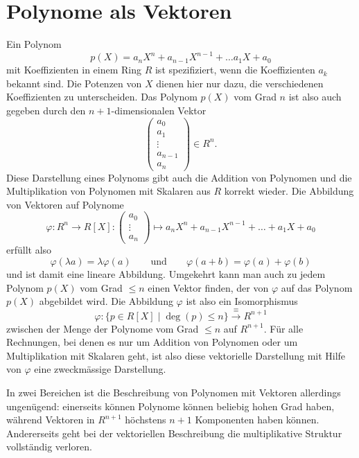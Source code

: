 %
%
%
\section{Polynome als Vektoren
\label{buch:section:polynome:vektoren}}
Ein Polynom
\[
p(X) = a_nX^n + a_{n-1}X^{n-1} + \dots a_1X+a_0
\]
mit Koeffizienten in einem Ring $R$
ist spezifiziert, wenn die Koeffizienten $a_k$ bekannt sind.
Die Potenzen von $X$ dienen hier nur dazu, die verschiedenen
Koeffizienten zu unterscheiden.
Das Polynom $p(X)$ vom Grad $n$ ist also auch gegeben durch den
$n+1$-dimensionalen Vektor
\[
\begin{pmatrix}
a_0\\
a_1\\
\vdots\\
a_{n-1}\\
a_{n}
\end{pmatrix}
\in
R^n.
\]
Diese Darstellung eines Polynoms gibt auch die Addition von Polynomen
und die Multiplikation von Polynomen mit Skalaren aus $R$ korrekt wieder.
Die Abbildung von Vektoren auf Polynome
\[
\varphi
\colon  R^n \to R[X]
:
\begin{pmatrix}a_0\\\vdots\\a_n\end{pmatrix}
\mapsto 
a_nX^n + a_{n-1}X^{n-1}+\dots+a_1X+a_0
\]
erfüllt also 
\[
\varphi( \lambda a) = \lambda \varphi(a)
\qquad\text{und}\qquad
\varphi(a+b) = \varphi(a) + \varphi(b)
\]
und ist damit eine lineare Abbildung.
Umgekehrt kann man auch zu jedem Polynom $p(X)$ vom Grad $\le n$ einen 
Vektor finden, der von $\varphi$ auf das Polynom $p(X)$ abgebildet wird.
Die Abbildung $\varphi$ ist also ein Isomorphismus
\[
\varphi
\colon
\{p\in R[X]\;|\; \deg(p) \le n\}
\overset{\equiv}{\to}
R^{n+1}
\]
zwischen der Menge
der Polynome vom Grad $\le n$ auf $R^{n+1}$.
Für alle Rechnungen, bei denen es nur um Addition von Polynomen oder
um Multiplikation mit Skalaren geht, ist also diese vektorielle Darstellung
mit Hilfe von $\varphi$ eine zweckmässige Darstellung.

In zwei Bereichen ist die Beschreibung von Polynomen mit Vektoren allerdings
ungenügend: einerseits können Polynome können beliebig hohen Grad haben,
während Vektoren in $R^{n+1}$ höchstens $n+1$ Komponenten haben können.
Andererseits geht bei der vektoriellen Beschreibung die multiplikative
Struktur vollständig verloren.

